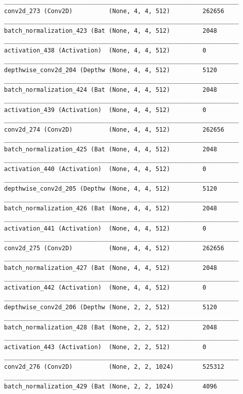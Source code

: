 \documentclass{article}
\begin{document}
\begin{appendices}
\begin{lstlisting}
_________________________________________________________________
conv2d_273 (Conv2D)          (None, 4, 4, 512)         262656    
_________________________________________________________________
batch_normalization_423 (Bat (None, 4, 4, 512)         2048      
_________________________________________________________________
activation_438 (Activation)  (None, 4, 4, 512)         0         
_________________________________________________________________
depthwise_conv2d_204 (Depthw (None, 4, 4, 512)         5120      
_________________________________________________________________
batch_normalization_424 (Bat (None, 4, 4, 512)         2048      
_________________________________________________________________
activation_439 (Activation)  (None, 4, 4, 512)         0         
_________________________________________________________________
conv2d_274 (Conv2D)          (None, 4, 4, 512)         262656    
_________________________________________________________________
batch_normalization_425 (Bat (None, 4, 4, 512)         2048      
_________________________________________________________________
activation_440 (Activation)  (None, 4, 4, 512)         0         
_________________________________________________________________
depthwise_conv2d_205 (Depthw (None, 4, 4, 512)         5120      
_________________________________________________________________
batch_normalization_426 (Bat (None, 4, 4, 512)         2048      
_________________________________________________________________
activation_441 (Activation)  (None, 4, 4, 512)         0         
_________________________________________________________________
conv2d_275 (Conv2D)          (None, 4, 4, 512)         262656    
_________________________________________________________________
batch_normalization_427 (Bat (None, 4, 4, 512)         2048      
_________________________________________________________________
activation_442 (Activation)  (None, 4, 4, 512)         0         
_________________________________________________________________
depthwise_conv2d_206 (Depthw (None, 2, 2, 512)         5120      
_________________________________________________________________
batch_normalization_428 (Bat (None, 2, 2, 512)         2048      
_________________________________________________________________
activation_443 (Activation)  (None, 2, 2, 512)         0         
_________________________________________________________________
conv2d_276 (Conv2D)          (None, 2, 2, 1024)        525312    
_________________________________________________________________
batch_normalization_429 (Bat (None, 2, 2, 1024)        4096      

\end{lstlisting}
\end{appendices}
\end{document}
